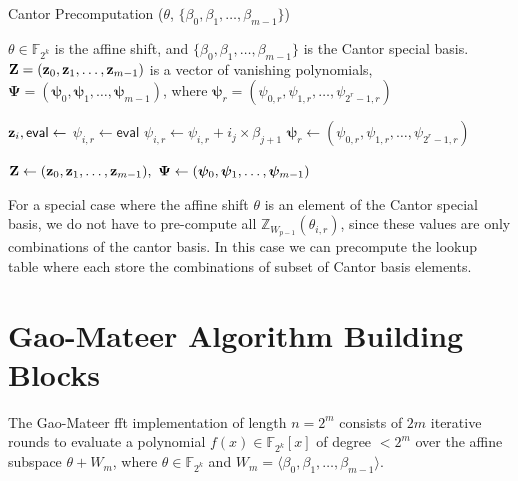 \begin{algorithm}[h]
	\caption{Cantor Precomputation ($\theta$, $\{\beta_0, \beta_1, \ldots, \beta_{m-1}\}$)}
	\label{Algo:Cantor_Precomp}
	\begin{algorithmic}[1]
		\Require $\theta \in \mathbb{F}_{2^k}$ is the affine shift, and $\{\beta_0, \beta_1, \ldots, \beta_{m-1}\}$ is the Cantor special basis.
		\Ensure $\mathbf{Z} = ({\bf{z}}_0, {\bf{z}}_1, \ldots, {\bf{z}}_{m-1})$ is a vector of vanishing polynomials,  
		$\boldsymbol{\Psi} = (\boldsymbol{\psi}_0, \boldsymbol{\psi}_1, \ldots, \boldsymbol{\psi}_{m-1})$,  
		where $\boldsymbol{\psi}_r = ( \psi_{0,r}, \psi_{1,r}, \ldots, \psi_{2^r-1,r} )$
		
		\State ${\bf{z}}_i, \mathsf{eval} \gets$ 
		\State $\psi_{i,r} \gets \mathsf{eval}$
		\State $\psi_{i,r} \gets \psi_{i,r} + i_j \times \beta_{j+1}$
		\EndFor
		\EndFor
		\State $\boldsymbol{\psi}_r \gets ( \psi_{0,r}, \psi_{1,r}, \ldots, \psi_{2^r - 1,r} )$
		\EndFor
		
		\State \Return $\mathbf{Z} \gets ({\bf{z}}_0, {\bf{z}}_1, \ldots, {\bf{z}}_{m-1}),\ \boldsymbol{\Psi} \gets (\boldsymbol{\psi}_0, \boldsymbol{\psi}_1, \ldots, \boldsymbol{\psi}_{m-1})$
	\end{algorithmic}
\end{algorithm}



For a special case where the affine shift $\theta$ is an element of the Cantor special basis, we do not have to pre-compute all $\mathbb{Z}_{W_{p-1}}(\theta_{i, r})$, since these values are only combinations of the cantor basis. In this case we can precompute the lookup table where each store the combinations of subset of Cantor basis elements. 


\section{Gao-Mateer Algorithm Building Blocks}\label{Sec:Gao-implementation}

The Gao-Mateer \gls{fft} implementation of length $n = 2^m$ consists of $2m$ iterative rounds to evaluate a polynomial $f(x) \in \mathbb{F}_{2^k}[x]$ of degree $< 2^m$ over the affine subspace $\theta + W_m$, where $\theta \in \mathbb{F}_{2^k}$ and $W_m = \langle \beta_0, \beta_1, \ldots, \beta_{m-1} \rangle$. %

